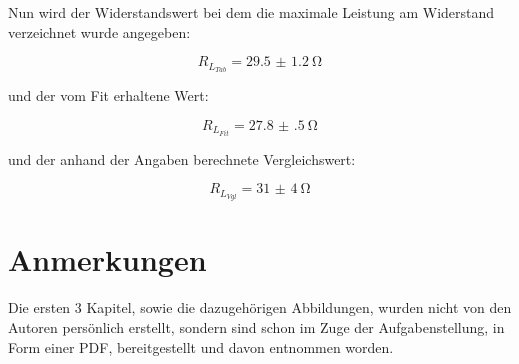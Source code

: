 \documentclass[11pt,ngerman]{scrartcl}
\begin{document}
Nun wird der Widerstandswert bei dem die maximale Leistung am Widerstand verzeichnet wurde angegeben:

\begin{equation}
	R_{L_{Tab}}=\SI{29.5(12)}{\ohm}
	\label{eq:}
\end{equation}

und der vom Fit erhaltene Wert:

\begin{equation}
	R_{L_{Fit}}=\SI{27.8(5)}{\ohm}
	\label{eq:}
\end{equation}

und der anhand der Angaben berechnete Vergleichswert:

\begin{equation}
	R_{L_{Vgl}}=\SI{31(4)}{\ohm}
	\label{eq:}
\end{equation}

\section{Anmerkungen}

Die ersten 3 Kapitel, sowie die dazugehörigen Abbildungen, wurden nicht von den
Autoren persönlich erstellt, sondern sind schon im Zuge der Aufgabenstellung,
in Form einer PDF, bereitgestellt und davon entnommen worden. \cite{vorlagetrafo}


\newpage

% 
% 
\printbibliography
\listoffigures
\listoftables
\end{document}
